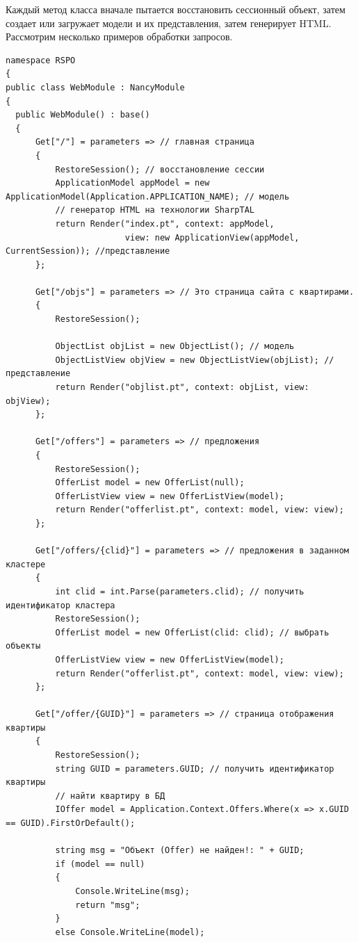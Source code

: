 \documentclass[a4paper,14pt,openany,final]{extreport} %
\begin{document}
{Каждый метод класса вначале пытается восстановить сессионный объект, затем создает или загружает модели и их представления, затем генерирует HTML. Рассмотрим несколько примеров обработки запросов.
\begin{verbatim}
namespace RSPO
{
public class WebModule : NancyModule
{
  public WebModule() : base()
  {
      Get["/"] = parameters => // главная страница
      {
          RestoreSession(); // восстановление сессии
          ApplicationModel appModel = new ApplicationModel(Application.APPLICATION_NAME); // модель
          // генератор HTML на технологии SharpTAL
          return Render("index.pt", context: appModel,
                        view: new ApplicationView(appModel, CurrentSession)); //представление
      };

      Get["/objs"] = parameters => // Это страница сайта с квартирами.
      {
          RestoreSession();

          ObjectList objList = new ObjectList(); // модель
          ObjectListView objView = new ObjectListView(objList); // представление
          return Render("objlist.pt", context: objList, view: objView);
      };

      Get["/offers"] = parameters => // предложения
      {
          RestoreSession();
          OfferList model = new OfferList(null);
          OfferListView view = new OfferListView(model);
          return Render("offerlist.pt", context: model, view: view);
      };

      Get["/offers/{clid}"] = parameters => // предложения в заданном кластере
      {
          int clid = int.Parse(parameters.clid); // получить идентификатор кластера
          RestoreSession();
          OfferList model = new OfferList(clid: clid); // выбрать объекты
          OfferListView view = new OfferListView(model);
          return Render("offerlist.pt", context: model, view: view);
      };

      Get["/offer/{GUID}"] = parameters => // страница отображения квартиры
      {
          RestoreSession();
          string GUID = parameters.GUID; // получить идентификатор квартиры
          // найти квартиру в БД
          IOffer model = Application.Context.Offers.Where(x => x.GUID == GUID).FirstOrDefault();

          string msg = "Объект (Offer) не найден!: " + GUID;
          if (model == null)
          {
              Console.WriteLine(msg);
              return "msg";
          }
          else Console.WriteLine(model);


\end{verbatim}}
\end{document}
